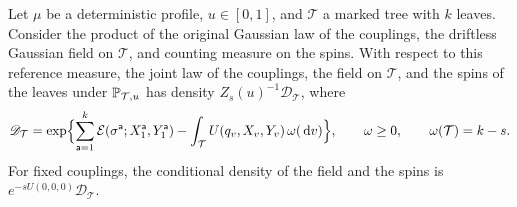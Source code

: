 \begin{lemma}\label{lem:tree-density}
Let $\mu$ be a deterministic profile, $u\in[0,1]$, and $\mathcal T$ a
marked tree with $k$ leaves. Consider the product of the original
Gaussian law of the couplings, the driftless Gaussian field on
$\mathcal T$, and counting measure on the spins. With respect to this
reference measure, the joint law of the couplings, the field on
$\mathcal T$, and the spins of the leaves under $\mathbb P_{\mathcal T,u}$ has
density $Z_s(u)^{-1}\mathscr D_{\mathcal T}$, where
\begin{equation}\label{eq:treedensity}
 \mathscr D_{\mathcal T}=\exp\Bigl\{
       \sum_{\mathsf a=1}^k\mathcal E(\sigma^{\mathsf a};
                  X^{\mathsf a}_1,Y^{\mathsf a}_1)
       -\int_{\mathcal T}U(q_v,X_v,Y_v)\,\omega(\,\mathrm d v)\Bigr\},
 \qquad \omega\ge0,\qquad \omega(\mathcal T)=k-s.
\end{equation}
For fixed couplings, the conditional density of the field and the spins
is $e^{-sU(0,0,0)}\mathscr D_{\mathcal T}$.
\end{lemma}


